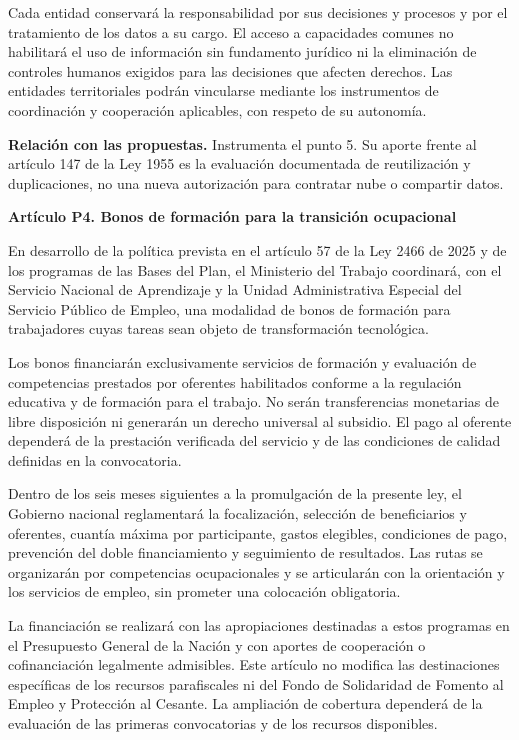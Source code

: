 Cada entidad conservará la responsabilidad por sus decisiones y procesos y por el tratamiento de los datos a su cargo. El acceso a capacidades comunes no habilitará el uso de información sin fundamento jurídico ni la eliminación de controles humanos exigidos para las decisiones que afecten derechos. Las entidades territoriales podrán vincularse mediante los instrumentos de coordinación y cooperación aplicables, con respeto de su autonomía.

\textbf{Relación con las propuestas.} Instrumenta el punto 5. Su aporte frente al artículo 147 de la Ley 1955 es la evaluación documentada de reutilización y duplicaciones, no una nueva autorización para contratar nube o compartir datos.

\textbf{Artículo P4. Bonos de formación para la transición ocupacional}\par\nobreak

En desarrollo de la política prevista en el artículo 57 de la Ley 2466 de 2025 y de los programas de las Bases del Plan, el Ministerio del Trabajo coordinará, con el Servicio Nacional de Aprendizaje y la Unidad Administrativa Especial del Servicio Público de Empleo, una modalidad de bonos de formación para trabajadores cuyas tareas sean objeto de transformación tecnológica.

Los bonos financiarán exclusivamente servicios de formación y evaluación de competencias prestados por oferentes habilitados conforme a la regulación educativa y de formación para el trabajo. No serán transferencias monetarias de libre disposición ni generarán un derecho universal al subsidio. El pago al oferente dependerá de la prestación verificada del servicio y de las condiciones de calidad definidas en la convocatoria.

Dentro de los seis meses siguientes a la promulgación de la presente ley, el Gobierno nacional reglamentará la focalización, selección de beneficiarios y oferentes, cuantía máxima por participante, gastos elegibles, condiciones de pago, prevención del doble financiamiento y seguimiento de resultados. Las rutas se organizarán por competencias ocupacionales y se articularán con la orientación y los servicios de empleo, sin prometer una colocación obligatoria.

La financiación se realizará con las apropiaciones destinadas a estos programas en el Presupuesto General de la Nación y con aportes de cooperación o cofinanciación legalmente admisibles. Este artículo no modifica las destinaciones específicas de los recursos parafiscales ni del Fondo de Solidaridad de Fomento al Empleo y Protección al Cesante. La ampliación de cobertura dependerá de la evaluación de las primeras convocatorias y de los recursos disponibles.


